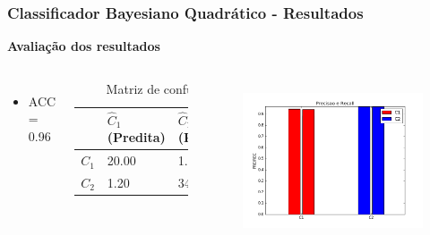\documentclass{beamer}
\begin{document}
\begin{frame}
\frametitle{Classificador Bayesiano Quadrático - Resultados}

\textbf{Avaliação dos resultados}
\begin{columns}[c] 
\begin{itemize}
\item ACC = 0.96
\end{itemize}

\begin{table}
\begin{tabular}{l l l}
\toprule
 & \textbf{$\hat{C}_1$ (Predita)} & \textbf{$\hat{C}_2$(Predita)}\\
\midrule
$C_1$ & 20.00&1.20\\ 
$C_2$ &  1.20&34.50\\ 

\bottomrule
\end{tabular}
\caption{Matriz de confusão}
\end{table}


\begin{figure}[H]
\centering
  \includegraphics[width=\linewidth]{../img/quad_bayes_rec.png}
  \label{fig:percep}
\end{figure}%

\end{columns}

\end{frame}
\end{document}
